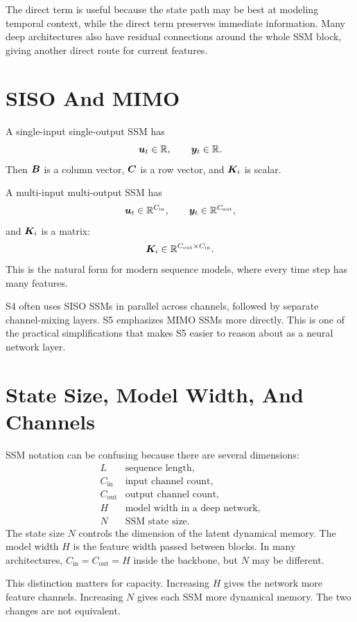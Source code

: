 The direct term is useful because the state path may be best at modeling temporal context,
while the direct term preserves immediate information. Many deep architectures also have
residual connections around the whole SSM block, giving another direct route for current
features.

\section{SISO And MIMO}

A single-input single-output SSM has
\[
  \bm{u}_t \in \mathbb{R},\qquad \bm{y}_t \in \mathbb{R}.
\]
Then $\bm{B}$ is a column vector, $\bm{C}$ is a row vector, and $\bm{K}_i$ is scalar.

A multi-input multi-output SSM has
\[
  \bm{u}_t \in \mathbb{R}^{C_{\mathrm{in}}},
  \qquad
  \bm{y}_t \in \mathbb{R}^{C_{\mathrm{out}}},
\]
and $\bm{K}_i$ is a matrix:
\[
  \bm{K}_i \in \mathbb{R}^{C_{\mathrm{out}} \times C_{\mathrm{in}}}.
\]
This is the natural form for modern sequence models, where every time step has many
features.

S4 often uses SISO SSMs in parallel across channels, followed by separate channel-mixing
layers. S5 emphasizes MIMO SSMs more directly. This is one of the practical simplifications
that makes S5 easier to reason about as a neural network layer.

\section{State Size, Model Width, And Channels}

SSM notation can be confusing because there are several dimensions:
\[
\begin{array}{ll}
L & \text{sequence length}, \\
C_{\mathrm{in}} & \text{input channel count}, \\
C_{\mathrm{out}} & \text{output channel count}, \\
H & \text{model width in a deep network}, \\
N & \text{SSM state size}.
\end{array}
\]
The state size $N$ controls the dimension of the latent dynamical memory. The model width
$H$ is the feature width passed between blocks. In many architectures,
$C_{\mathrm{in}}=C_{\mathrm{out}}=H$ inside the backbone, but $N$ may be different.

This distinction matters for capacity. Increasing $H$ gives the network more feature
channels. Increasing $N$ gives each SSM more dynamical memory. The two changes are not
equivalent.

